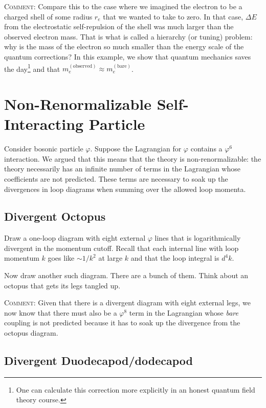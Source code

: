 \documentclass[12pt]{article}
\numberwithin{equation}{section}    %
\begin{document}
\textsc{Comment}: Compare this to the case where we imagined the electron to be a charged shell of some radius $r_e$ that we wanted to take to zero. In that case, $\Delta E$ from the electrostatic self-repulsion of the shell was much larger than the observed electron mass. That is what is called a hierarchy (or tuning) problem: why is the mass of the electron so much smaller than the energy scale of the quantum corrections? In this example, we show that quantum mechanics saves the day\footnote{One can calculate this correction more explicitly in an honest quantum field theory course.} and that $m_e^{(\text{observed})} \approx m_e^{(\text{bare})}$. 


\section{Non-Renormalizable Self-Interacting Particle}

Consider bosonic particle $\varphi$. Suppose the Lagrangian for $\varphi$ contains a $\varphi^6$ interaction. We argued that this means that the theory is non-renormalizable: the theory necessarily has an infinite number of terms in the Lagrangian whose coefficients are not predicted. These terms are necessary to soak up the divergences in loop diagrams when summing over the allowed loop momenta. 
 

\subsection{Divergent Octopus}

Draw a one-loop diagram with eight external $\varphi$ lines that is logarithmically divergent in the momentum cutoff. Recall that each internal line with loop momentum $k$ goes like $\sim 1/k^2$ at large $k$ and that the loop integral is $d^4k$. 

Now draw another such diagram. There are a bunch of them. Think about an octopus that gets its legs tangled up.

\textsc{Comment:} Given that there is a divergent diagram with eight external legs, we now know that there must also be a $\varphi^8$ term in the Lagrangian whose \emph{bare} coupling is not predicted because it has to soak up the divergence from the octopus diagram.

\subsection{Divergent Duodecapod/dodecapod}
\end{document}
